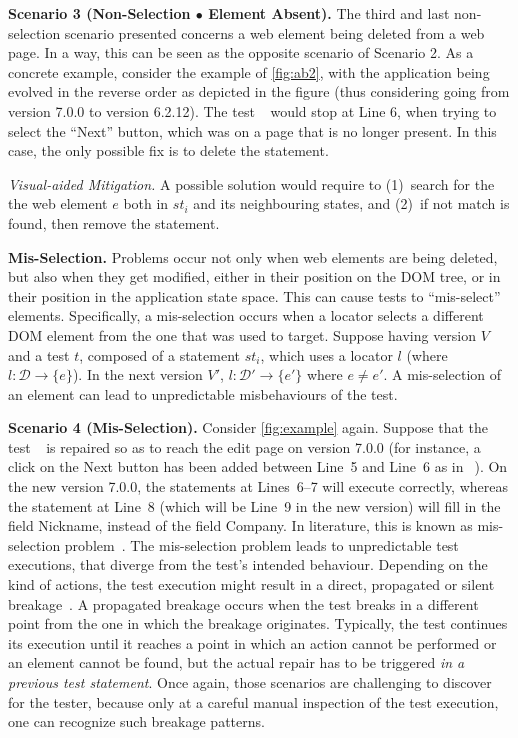 \noindent
\textbf{Scenario 3 (Non-Selection $\bullet$ Element Absent).} 
%
The third and last non-selection scenario presented concerns a web element being deleted from a web page. In a way, this can be seen as the opposite scenario of Scenario 2. 
As a concrete example, consider the example of \autoref{fig:ab2}, with the application being evolved in the reverse order as depicted in the figure (thus considering going from version 7.0.0 to version 6.2.12). The test~\textcircled{} would stop at Line 6, when trying to select the ``Next'' button, which was on a page that is no longer present. In this case, the only possible fix is to delete the statement.

\noindent
\textit{Visual-aided Mitigation.}
A possible solution would require to (1)~search for the the web element $e$ both in $st_i$ and its neighbouring states, and (2)~if not match is found, then remove the statement.

\noindent
\textbf{Mis-Selection.}\label{sec:misselection}
Problems occur not only when web elements are being deleted, but also when they get modified, either in their position on the DOM tree, or in their position in the application state space. This can cause tests to ``mis-select'' elements.
Specifically, a mis-selection occurs when a locator selects a different DOM element from the one that was used to target. Suppose having version $V$ and a test $t$, composed of a statement $st_i$, which uses a locator $l$ (where $l: \mathcal{D} \rightarrow \{e\}$).
In the next version $V'$, $l: \mathcal{D}' \rightarrow \{e'\}$ where $e \ne e'$.
A mis-selection of an element can lead to unpredictable misbehaviours of the test. 

\noindent
\textbf{Scenario 4 (Mis-Selection).} 
Consider \autoref{fig:example} again. 
Suppose that the test~\textcircled{} is repaired so as to reach the edit page on version 7.0.0 (for instance, a click on the Next button has been added between Line~5 and Line~6 as in~\textcircled{}). On the new version 7.0.0, the statements at Lines~6--7 will execute correctly, whereas the statement at Line~8 (which will be Line~9 in the new version) will fill in the field Nickname, instead of the field Company. In literature, this is known as mis-selection problem~\cite{Choudhary:2011:WWA:2002931.2002935}. %
The mis-selection problem leads to unpredictable test executions, that diverge from the test's intended behaviour. Depending on the kind of actions, the test execution might result in a direct, propagated or silent breakage~\cite{Hammoudi-2016-ICST}. A propagated breakage occurs when the test breaks in a different point from the one in which the breakage originates. Typically, the test continues its execution until it reaches a point in which an action cannot be performed or an element cannot be found, but the actual repair has to be triggered \textit{in a previous test statement}. Once again, those scenarios are challenging to discover for the tester, because only at a careful manual inspection of the test execution, one can recognize such breakage patterns.

